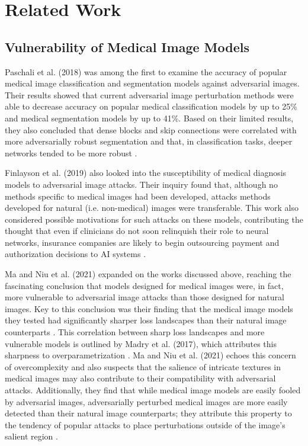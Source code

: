 \documentclass[10pt,twocolumn,letterpaper]{article}
\begin{document}
\section{Related Work}
  \subsection{Vulnerability of Medical Image Models}
    Paschali et al. (2018) was among the first to examine the accuracy of popular medical image classification and segmentation models against adversarial images. Their results showed that current adversarial image perturbation methods were able to decrease accuracy on popular medical classification models by up to 25\% and medical segmentation models by up to 41\%. Based on their limited results, they also concluded that dense blocks and skip connections were correlated with more adversarially robust segmentation and that, in classification tasks, deeper networks tended to be more robust \cite{Paschali}.

    Finlayson et al. (2019) also looked into the susceptibility of medical diagnosis models to adversarial image attacks. Their inquiry found that, although no methods specific to medical images had been developed, attacks methods developed for natural (i.e. non-medical) images were transferable. This work also considered possible motivations for such attacks on these models, contributing the thought that even if clinicians do not soon relinquish their role to neural networks, insurance companies are likely to begin outsourcing payment and authorization decisions to AI systems \cite{Finlayson}.

    Ma and Niu et al. (2021) expanded on the works discussed above, reaching the fascinating conclusion that models designed for medical images were, in fact, more vulnerable to adversarial image attacks than those designed for natural images. Key to this conclusion was their finding that the medical image models they tested had significantly sharper loss landscapes than their natural image counterparts \cite{MaNiu}. This correlation between sharp loss landscapes and more vulnerable models is outlined by Madry et al. (2017), which attributes this sharpness to overparametrization \cite{Madry}. Ma and Niu et al. (2021) echoes this concern of overcomplexity and also suspects that the salience of intricate textures in medical images may also contribute to their compatibility with adversarial attacks. Additionally, they find that while medical image models are easily fooled by adversarial images, adversarially perturbed medical images are more easily detected than their natural image counterparts; they attribute this property to the tendency of popular attacks to place perturbations outside of the image's salient region \cite{MaNiu}.
\end{document}
